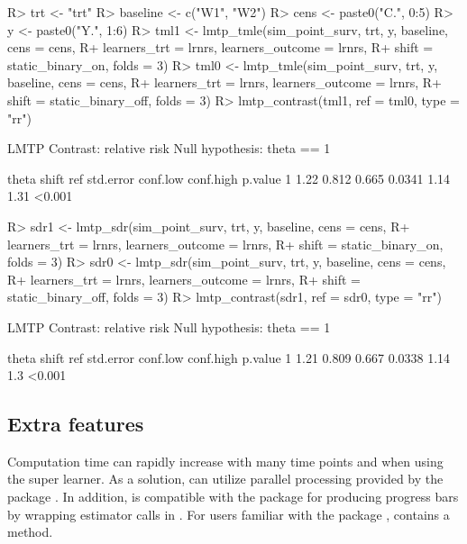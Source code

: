 \documentclass[]{jss}
\begin{document}
\begin{CodeChunk}

\begin{CodeInput}
R> trt <- "trt"
R> baseline <- c("W1", "W2")
R> cens <- paste0("C.", 0:5)
R> y <- paste0("Y.", 1:6)
R> tml1 <- lmtp_tmle(sim_point_surv, trt, y, baseline, cens = cens, 
R+                   learners_trt = lrnrs, learners_outcome = lrnrs,
R+                   shift = static_binary_on, folds = 3)
R> tml0 <- lmtp_tmle(sim_point_surv, trt, y, baseline, cens = cens, 
R+                   learners_trt = lrnrs, learners_outcome = lrnrs,
R+                   shift = static_binary_off, folds = 3)
R> lmtp_contrast(tml1, ref = tml0, type = "rr")
\end{CodeInput}

\begin{CodeOutput}
  LMTP Contrast: relative risk
Null hypothesis: theta == 1

  theta shift   ref std.error conf.low conf.high p.value
1  1.22 0.812 0.665    0.0341     1.14      1.31  <0.001
\end{CodeOutput}

\begin{CodeInput}
R> sdr1 <- lmtp_sdr(sim_point_surv, trt, y, baseline, cens = cens, 
R+                 learners_trt = lrnrs, learners_outcome = lrnrs,
R+                 shift = static_binary_on, folds = 3)
R> sdr0 <- lmtp_sdr(sim_point_surv, trt, y, baseline, cens = cens, 
R+                 learners_trt = lrnrs, learners_outcome = lrnrs,
R+                 shift = static_binary_off, folds = 3)
R> lmtp_contrast(sdr1, ref = sdr0, type = "rr")
\end{CodeInput}

\begin{CodeOutput}
  LMTP Contrast: relative risk
Null hypothesis: theta == 1

  theta shift   ref std.error conf.low conf.high p.value
1  1.21 0.809 0.667    0.0338     1.14       1.3  <0.001
\end{CodeOutput}

\end{CodeChunk}

\hypertarget{extra-features}{%
\subsection{Extra features}\label{extra-features}}

Computation time can rapidly increase with many time points and when using the super learner. As a solution,  
can utilize parallel processing provided by the  package \citep{future}. In addition, 
 is compatible with the  package \citep{progressr} for producing progress bars by wrapping estimator calls in
. For users familiar with the  package \citep{broom},  contains a  method. 
\end{document}
